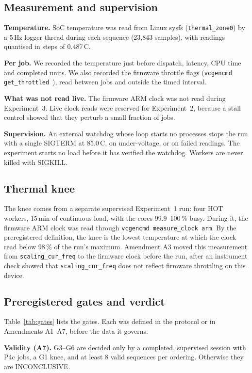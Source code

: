 \documentclass[conference,a4paper]{IEEEtran}
\newcommand{\degC}{\,\textdegree{}C}
\newcommand{\code}[1]{\texttt{#1}}
\begin{document}
\subsection{Measurement and supervision}
\textbf{Temperature.} SoC temperature was read from Linux sysfs (\code{thermal\_zone0}) by a 5\,Hz logger thread
during each sequence (23{,}843 samples), with readings quantised in steps of 0.487\degC{}.

\textbf{Per job.} We recorded the temperature just before dispatch, latency, CPU time and completed units. We also
recorded the firmware throttle flags (\code{vcgencmd get\_throttled}~\cite{rpi-throttled}), read between jobs and
outside the timed interval.

\textbf{What was not read live.} The firmware ARM clock was not read during Experiment~3. Live clock reads were
reserved for Experiment~2, because a stall control showed that they perturb a small fraction of jobs.

\textbf{Supervision.} An external watchdog whose loop starts no processes stops the run with a single SIGTERM at
85.0\degC{}, on under-voltage, or on failed readings. The experiment starts no load before it has verified the
watchdog. Workers are never killed with SIGKILL.

\subsection{Thermal knee}
The knee comes from a separate supervised Experiment~1 run: four HOT workers, 15\,min of continuous load, with the
cores 99.9--100\,\% busy. During it, the firmware ARM clock was read through \code{vcgencmd measure\_clock arm}. By
the preregistered definition, the knee is the lowest temperature at which the clock read below 98\,\% of the run's
maximum. Amendment A3 moved this measurement from \code{scaling\_cur\_freq} to the firmware clock before the run,
after an instrument check showed that \code{scaling\_cur\_freq} does not reflect firmware throttling on this device.

\subsection{Preregistered gates and verdict}
Table~\ref{tab:gates} lists the gates. Each was defined in the protocol or in Amendments A1--A7, before the data
it governs.

\textbf{Validity (A7).} G3--G6 are decided only by a completed, supervised session with P4c jobs, a G1 knee, and at
least 8 valid sequences per ordering. Otherwise they are INCONCLUSIVE.
\end{document}
